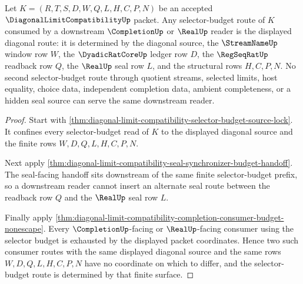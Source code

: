 \begin{theorem}
\label{thm:diagonal-limit-selector-budget-route-determinacy}
Let $K=(R,T,S,D,W,Q,L,H,C,P,N)$ be an accepted $\DiagonalLimitCompatibilityUp$ packet. Any selector-budget route of $K$ consumed by a downstream $\CompletionUp$ or $\RealUp$ reader is the displayed diagonal route: it is determined by the diagonal source, the $\StreamNameUp$ window row $W$, the $\DyadicRatCoreUp$ ledger row $D$, the $\RegSeqRatUp$ readback row $Q$, the $\RealUp$ seal row $L$, and the structural rows $H,C,P,N$. No second selector-budget route through quotient streams, selected limits, host equality, choice data, independent completion data, ambient completeness, or a hidden seal source can serve the same downstream reader.
\end{theorem}
\begin{proof}
Start with \autoref{thm:diagonal-limit-compatibility-selector-budget-source-lock}. It confines every selector-budget read of $K$ to the displayed diagonal source and the finite rows $W,D,Q,L,H,C,P,N$.

Next apply \autoref{thm:diagonal-limit-compatibility-seal-synchronizer-budget-handoff}. The seal-facing handoff sits downstream of the same finite selector-budget prefix, so a downstream reader cannot insert an alternate seal route between the readback row $Q$ and the $\RealUp$ seal row $L$.

Finally apply \autoref{thm:diagonal-limit-compatibility-completion-consumer-budget-nonescape}. Every $\CompletionUp$-facing or $\RealUp$-facing consumer using the selector budget is exhausted by the displayed packet coordinates. Hence two such consumer routes with the same displayed diagonal source and the same rows $W,D,Q,L,H,C,P,N$ have no coordinate on which to differ, and the selector-budget route is determined by that finite surface.
\end{proof}

